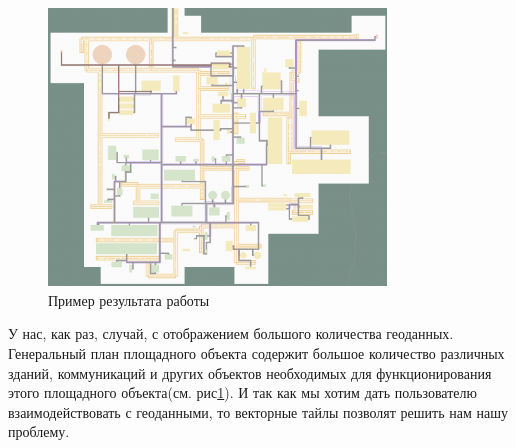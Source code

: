 \begin{figure}
    \begin{center}
        \includegraphics[width=0.8\textwidth]{images/introduction/1}
    \end{center}
    \caption{Пример результата работы}
    \label{pic:problem__site-plan}
\end{figure}
У нас, как раз, случай, с отображением большого количества геоданных.
Генеральный план площадного объекта содержит большое количество различных зданий, коммуникаций и других объектов
необходимых для функционирования этого площадного объекта(см. рис\ref{pic:problem__site-plan}). И так как мы хотим дать
пользователю взаимодействовать с геоданными, то векторные тайлы позволят решить нам нашу проблему.



